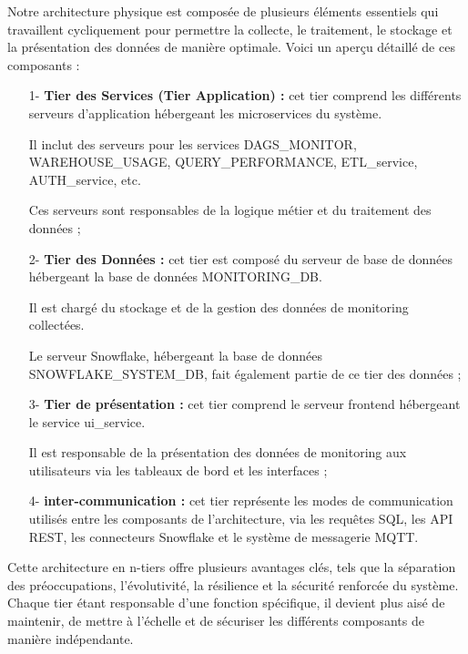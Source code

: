         \par Notre architecture physique est composée de plusieurs éléments essentiels qui travaillent cycliquement pour permettre la collecte, le traitement, le stockage et la présentation des données de manière optimale. Voici un aperçu détaillé de ces composants  :
        \begin{enumerate}
            \item[1-] \textbf{Tier des Services (Tier Application) : } 
            cet tier comprend les différents serveurs d'application hébergeant les microservices du système.
            \par Il inclut des serveurs pour les services DAGS\_MONITOR, WAREHOUSE\_USAGE, QUERY\_PERFORMANCE, ETL\_service, AUTH\_service, etc.
            \par Ces serveurs sont responsables de la logique métier et du traitement des données ;
            \item [2-] \textbf{Tier des Données :} 
            cet tier est composé du serveur de base de données hébergeant la base de données MONITORING\_DB.
            \par Il est chargé du stockage et de la gestion des données de monitoring collectées.
            \par Le serveur Snowflake, hébergeant la base de données SNOWFLAKE\_SYSTEM\_DB, fait également partie de ce tier des données ;
             
            \item[3-]  \textbf{Tier de présentation : }
            cet tier comprend le serveur frontend hébergeant le service ui\_service.
            \par Il est responsable de la présentation des données de monitoring aux utilisateurs via les tableaux de bord et les interfaces ;
            \item[4-] \textbf{inter-communication :}
            cet tier représente les modes de communication utilisés entre les composants de l'architecture, via les requêtes SQL, les API REST, les connecteurs Snowflake et le système de messagerie MQTT.

        \end{enumerate}
    \par Cette architecture en n-tiers offre plusieurs avantages clés, tels que la séparation des préoccupations, l'évolutivité, la résilience et la sécurité renforcée du système. 
    Chaque tier étant responsable d'une fonction spécifique, il devient plus aisé de maintenir, de mettre à l'échelle et de sécuriser les différents composants de manière indépendante.
